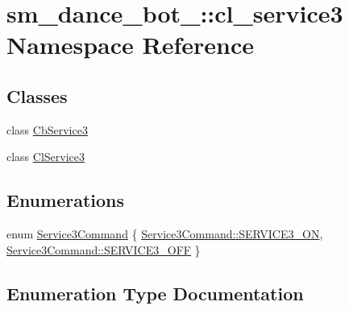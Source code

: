\hypertarget{namespacesm__dance__bot__2_1_1cl__service3}{}\section{sm\+\_\+dance\+\_\+bot\+\_\+:\+:cl\+\_\+service3 Namespace Reference}
\label{namespacesm__dance__bot__2_1_1cl__service3}
\subsection*{Classes}
\begin{DoxyCompactItemize}
\item 
class \hyperlink{classsm__dance__bot__2_1_1cl__service3_1_1CbService3}{Cb\+Service3}
\item 
class \hyperlink{classsm__dance__bot__2_1_1cl__service3_1_1ClService3}{Cl\+Service3}
\end{DoxyCompactItemize}
\subsection*{Enumerations}
\begin{DoxyCompactItemize}
\item 
enum \hyperlink{namespacesm__dance__bot__2_1_1cl__service3_adfc3ce70a327b24b4fb6d6b02803caff}{Service3\+Command} \{ \hyperlink{namespacesm__dance__bot__2_1_1cl__service3_adfc3ce70a327b24b4fb6d6b02803caffa13cdca48a01bbb44fa8fb35567fbc58e}{Service3\+Command\+::\+S\+E\+R\+V\+I\+C\+E3\+\_\+\+ON}, 
\hyperlink{namespacesm__dance__bot__2_1_1cl__service3_adfc3ce70a327b24b4fb6d6b02803caffa642ed22a7f6b816840289b4256116e9e}{Service3\+Command\+::\+S\+E\+R\+V\+I\+C\+E3\+\_\+\+O\+FF}
 \}
\end{DoxyCompactItemize}


\subsection{Enumeration Type Documentation}
\mbox{\label{namespacesm__dance__bot__2_1_1cl__service3_adfc3ce70a327b24b4fb6d6b02803caff}} 

